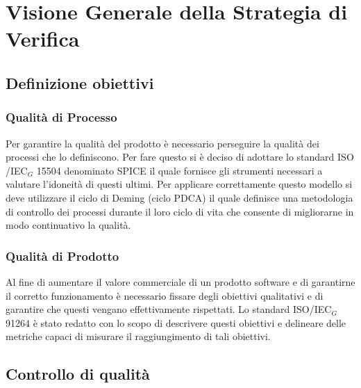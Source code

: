\section{Visione Generale della Strategia di Verifica}

\subsection{Definizione obiettivi}

\subsubsection{Qualità di Processo}
Per garantire la qualità del prodotto è necessario perseguire la qualità dei processi che lo definiscono. Per fare questo si è deciso di adottare lo standard ISO /IEC$_G$ 15504 denominato SPICE il quale fornisce gli strumenti necessari a valutare l’idoneità di questi ultimi. Per applicare correttamente questo modello si deve utilizzare il ciclo di Deming (ciclo PDCA) il quale definisce una metodologia di controllo dei processi durante il loro ciclo di vita che consente di migliorarne in modo continuativo la qualità.

\subsubsection{Qualità di Prodotto}
Al fine di aumentare il valore commerciale di un prodotto software e di garantirne il corretto funzionamento è necessario fissare degli obiettivi qualitativi e di garantire che questi vengano effettivamente rispettati. Lo standard ISO/IEC$_G$ 91264 è stato redatto con lo scopo di descrivere questi obiettivi e delineare delle metriche capaci di misurare il raggiungimento di tali obiettivi.

\subsection{Controllo di qualità}

